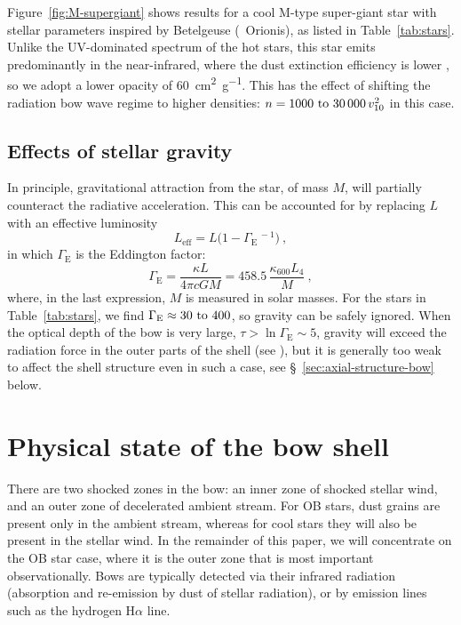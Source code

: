 Figure~\ref{fig:M-supergiant} shows results for a cool M-type
super-giant star with stellar parameters inspired by Betelgeuse
(\chemalpha~Orionis), as listed in Table~\ref{tab:stars}.  Unlike the
UV-dominated spectrum of the hot stars, this star emits predominantly
in the near-infrared, where the dust extinction efficiency is lower \citep{Weingartner:2001a},
so we adopt a lower opacity of \SI{60}{cm^2.g^{-1}}.  This has the
effect of shifting the radiation bow wave regime to higher densities:
\(n = \text{\numrange{1000}{30 000}}\, v_{10}^2\) in this case.


\subsection{Effects of stellar gravity}
\label{sec:effects-gravity}

In principle, gravitational attraction from the star, of mass \(M\),
will partially counteract the radiative acceleration.  This can be
accounted for by replacing \(L\) with an effective luminosity
\newcommand\Edd{\ensuremath{_{\text{E}}}}
\begin{equation}
  \label{eq:effective-luminosity}
  L_{\text{eff}} = L \bigl(1 - \Gamma\Edd^{\,-1}\bigr) \ ,
\end{equation}
in which \(\Gamma\Edd\) is the Eddington factor:
\begin{equation}
  \label{eq:eddington-factor}
  \Gamma\Edd = \frac{\kappa L}{4\pi c G M} = 458.5 \, \frac{\kappa_{600} L_4}{ M } \ ,
\end{equation}
where, in the last expression, \(M\) is measured in solar masses.  For
the stars in Table~\ref{tab:stars}, we find
\(\Gamma\Edd \approx \text{\numrange{30}{400}}\), so gravity can be safely
ignored.  When the optical depth of the bow is very large,
\(\tau > \ln\Gamma\Edd \sim 5\), gravity will exceed the radiation force in the
outer parts of the shell (see \citealt{Rodriguez-Ramirez:2016b}), but
it is generally too weak to affect the shell structure even in such a
case, see \S~\ref{sec:axial-structure-bow} below.


\section{Physical state of the bow shell}
\label{sec:phys-state-shock}

There are two shocked zones in the bow: an inner zone of shocked
stellar wind, and an outer zone of decelerated ambient stream. For OB
stars, dust grains are present only in the ambient stream, whereas for
cool stars they will also be present in the stellar wind.  In the
remainder of this paper, we will concentrate on the OB star case,
where it is the outer zone that is most important observationally.
Bows are typically detected via their infrared radiation (absorption
and re-emission by dust of stellar radiation), or by emission lines
such as the hydrogen H\(\alpha\) line.


